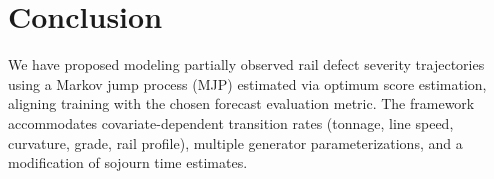 %
%

\section{Conclusion} \label{sec:conclusion}
We have proposed modeling partially observed rail defect severity trajectories using a Markov jump process (MJP) estimated via optimum score estimation, aligning training with the chosen forecast evaluation metric. The framework accommodates covariate-dependent transition rates (tonnage, line speed, curvature, grade, rail profile), multiple generator parameterizations, and a modification of sojourn time estimates.

